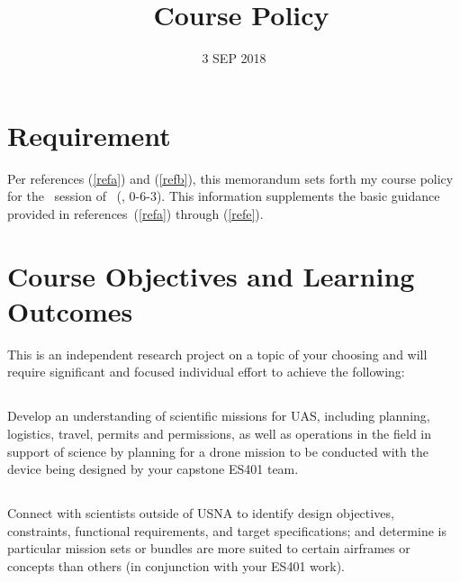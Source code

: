 \documentclass[10pt,courier]{navymemo}
\author{\usnaInstructorShort}
\title{\usnaCourseNumber\ Course Policy}
\date{3 SEP 2018}
\begin{document}
\makedateblock{}

\MEMORANDUM{}

\begin{navyletterheader}
\navyskip{}%

\navysubjline{}
\navyskip{}%
\end{navyletterheader}

\section{Requirement}
Per references (\ref{refa}) and (\ref{refb}), this memorandum sets forth my course policy for the \courseTerm\ session of \usnaCourseNumber\ (\usnaCourseName, 0-6-3).  This information supplements the basic guidance provided in references~(\ref{refa}) through (\ref{refe}). 

\section{Course Objectives and Learning Outcomes}  This is an independent research project on a topic of your choosing and will require significant and focused individual effort to achieve the following:
\subsection{} Develop an understanding of scientific missions for UAS, including planning, logistics, travel, permits and permissions, as well as operations in the field in support of science by planning for a drone mission to be conducted with the device being designed by your capstone ES401 team. 
\subsection{} Connect with scientists outside of USNA to identify design objectives, constraints, functional requirements, and target specifications; and determine is particular mission sets or bundles are more suited to certain airframes or concepts than others (in conjunction with your ES401 work). 
\end{document}

